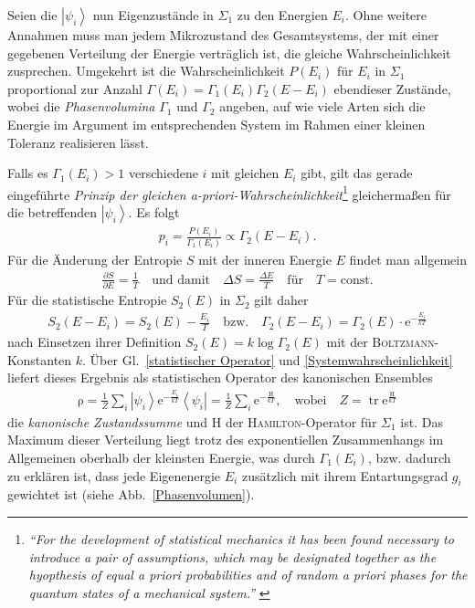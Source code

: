 \documentclass[a4paper, 10pt, twoside, openany]{book} %
\newcommand \bra[1]{\left \langle #1 \right |}
\newcommand \ket[1]{\left | #1 \right \rangle}
\def \E {\mathrm e}
\newcommand \op[1]{\mathrm{#1}}
\newcommand \pdiff[2]{\frac{\partial #1}{\partial #2}}
\begin{document}
	Seien die $\ket{\psi_i}$ nun Eigenzustände in $\Sigma_1$ zu den Energien $E_i$. Ohne weitere Annahmen muss man jedem Mikrozustand des Gesamtsystems, der mit einer gegebenen Verteilung der Energie verträglich ist, die gleiche Wahrscheinlichkeit zusprechen. Umgekehrt ist die Wahrscheinlichkeit $P(E_i)$ für $E_i$ in $\Sigma_1$ proportional zur Anzahl $\mathit \Gamma(E_i) = \mathit \Gamma_1(E_i) \mathit \Gamma_2(E - E_i)$ ebendieser Zustände, wobei die \emph{Phasenvolumina} $\mathit \Gamma_1$ und $\mathit \Gamma_2$ angeben, auf wie viele Arten sich die Energie im Argument im entsprechenden System im Rahmen einer kleinen Toleranz realisieren lässt.
	
	Falls es $\Gamma_1(E_i) > 1$ verschiedene $i$ mit gleichen $E_i$ gibt, gilt das gerade eingeführte \emph{Prinzip der gleichen a-priori-Wahrscheinlichkeit}\footnote{\emph{"`For the development of statistical mechanics it has been found necessary to introduce a pair of assumptions, which may be designated together as the hyopthesis of \emph{equal} a priori \emph{probabilities and of random} a priori \emph{phases} for the quantum states of a mechanical system."'} \cite[S.~4]{Tolman}} gleichermaßen für die betreffenden $\ket{\psi_i}$. Es folgt
	\begin{align}
		p_i = \frac{P(E_i)}{\mathit \Gamma_1(E_i)} \propto \Gamma_2(E - E_i).
		\label{Systemwahrscheinlichkeit}
	\end{align}
	Für die Änderung der Entropie $S$ mit der inneren Energie $E$ findet man allgemein
	\begin{align*}
		\pdiff S E = \frac 1 T \quad \text{und damit} \quad \Delta S = \frac {\Delta E} T \quad \text{für} \quad T = \text{const.}
	\end{align*}
	Für die statistische Entropie $S_2(E)$ in $\Sigma_2$ gilt daher
	\begin{align*}
		S_2(E - E_i) = S_2(E) - \frac {E_i} T \quad \text{bzw.} \quad \Gamma_2(E - E_i) = \Gamma_2(E) \cdot \E^{-\frac{E_i}{k T}}
	\end{align*}
	nach Einsetzen ihrer Definition $S_2(E) = k \log \Gamma_2(E)$ mit der \textsc{Boltzmann}-Konstanten $k$. Über Gl.~\ref{statistischer Operator} und \ref{Systemwahrscheinlichkeit} liefert dieses Ergebnis als statistischen Operator des kanonischen Ensembles
	\begin{align*}
		\op \rho = \frac 1 Z \sum_i \ket{\psi_i} \E^{-\frac{E_i}{k T}} \bra{\psi_i} = \frac 1 Z \sum_i \E^{-\frac{\op H}{k T}}, \quad \text{wobei} \quad Z = \operatorname{tr} \E^{\frac{\op H}{k T}}
	\end{align*}
	die \emph{kanonische Zustandssumme} und $\op H$ der \textsc{Hamilton}-Operator für $\Sigma_1$ ist. Das Maximum dieser Verteilung liegt trotz des exponentiellen Zusammenhangs im Allgemeinen oberhalb der kleinsten Energie, was durch $\mathit \Gamma_1(E_i)$, bzw. dadurch zu erklären ist, dass jede Eigenenergie $E_i$ zusätzlich mit ihrem Entartungsgrad $g_i$ gewichtet ist (siehe Abb.~\ref{Phasenvolumen}).
	
\end{document}
